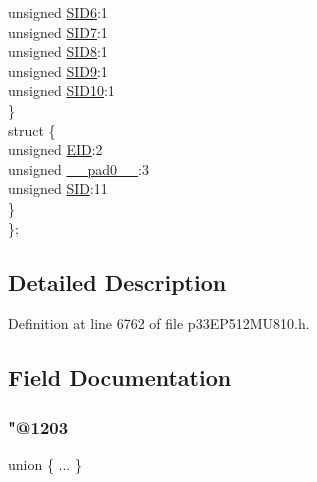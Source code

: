 \begin{DoxyCompactItemize}
\begin{tabbing}
\>\>unsigned \hyperlink{structtag_c2_r_x_f10_s_i_d_b_i_t_s_a70d70952133eb2389d5c326f9f0e8035}{SID6}:1\\
\>\>unsigned \hyperlink{structtag_c2_r_x_f10_s_i_d_b_i_t_s_a34097fb76decd431701fa2d86a22328e}{SID7}:1\\
\>\>unsigned \hyperlink{structtag_c2_r_x_f10_s_i_d_b_i_t_s_afe74894633244fdb0b0c01b4e8c522e7}{SID8}:1\\
\>\>unsigned \hyperlink{structtag_c2_r_x_f10_s_i_d_b_i_t_s_a33587704948067005c2a6a3ccc503c99}{SID9}:1\\
\>\>unsigned \hyperlink{structtag_c2_r_x_f10_s_i_d_b_i_t_s_a1a9084031c7f5fb16007feeebf0d8216}{SID10}:1\\
\>\} \\
\>struct \{\\
\>\>unsigned \hyperlink{structtag_c2_r_x_f10_s_i_d_b_i_t_s_ae80b378c9141f7c03e0b4e55b5f4b54d}{EID}:2\\
\>\>unsigned \hyperlink{structtag_c2_r_x_f10_s_i_d_b_i_t_s_adf71f3d8410c1f1dbbc96680a92c49af}{\_\_pad0\_\_}:3\\
\>\>unsigned \hyperlink{structtag_c2_r_x_f10_s_i_d_b_i_t_s_af88edf93b2fee2432665bd84f51287e4}{SID}:11\\
\>\} \\
\}; \\

\end{tabbing}\end{DoxyCompactItemize}


\subsection{Detailed Description}


Definition at line 6762 of file p33\+E\+P512\+M\+U810.\+h.



\subsection{Field Documentation}
\mbox{\label{structtag_c2_r_x_f10_s_i_d_b_i_t_s_a476f176d1c69e468de09eeba5e748357}} 
\subsubsection{\texorpdfstring{"@1203}{@1203}}
{\footnotesize\ttfamily union \{ ... \} }

\mbox{\label{structtag_c2_r_x_f10_s_i_d_b_i_t_s_adf71f3d8410c1f1dbbc96680a92c49af}} 
